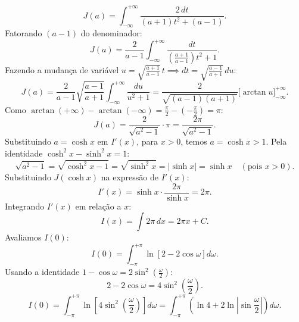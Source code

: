\documentclass[11pt,a4paper]{article}
\begin{document}
%
\begin{equation}
    J(a) = \int_{-\infty}^{+\infty} \frac{2\,dt}{(a+1)t^2 + (a-1)}.
\end{equation}
%
Fatorando $(a-1)$ do denominador:
\begin{equation}
    J(a) = \frac{2}{a-1} \int_{-\infty}^{+\infty} \frac{dt}{\left(\frac{a+1}{a-1}\right)t^2 + 1}.
\end{equation}
%
Fazendo a mudança de variável $u = \sqrt{\frac{a+1}{a-1}} \, t \implies dt = \sqrt{\frac{a-1}{a+1}} \, du$:
%
\begin{equation}
    J(a) = \frac{2}{a-1} \sqrt{\frac{a-1}{a+1}} \int_{-\infty}^{+\infty} \frac{du}{u^2 + 1} 
    = \frac{2}{\sqrt{(a-1)(a+1)}} \Big[ \arctan u \Big]_{-\infty}^{+\infty}.
\end{equation}
%
Como $\arctan(+\infty) - \arctan(-\infty) = \frac{\pi}{2} - \left(-\frac{\pi}{2}\right) = \pi$:
%
\begin{equation}
    J(a) = \frac{2}{\sqrt{a^2-1}} \cdot \pi = \frac{2\pi}{\sqrt{a^2-1}}.
\end{equation}
%
Substituindo $a = \cosh x$ em $I'(x)$, para $x > 0$, temos $a = \cosh x > 1$. Pela identidade $\cosh^2 x - \sinh^2 x = 1$:
%
\begin{equation}
    \sqrt{a^2-1} = \sqrt{\cosh^2 x - 1} = \sqrt{\sinh^2 x} = |\sinh x| = \sinh x \quad (\text{pois } x > 0).
\end{equation}
%
Substituindo $J(\cosh x)$ na expressão de $I'(x)$:
%
\begin{equation}
    I'(x) = \sinh x \cdot \frac{2\pi}{\sinh x} = 2\pi.
\end{equation}
%
Integrando $I'(x)$ em relação a $x$:
%
\begin{equation}
    I(x) = \int 2\pi \, dx = 2\pi x + C.
\end{equation}
%
Avaliamos $I(0)$:
%
\begin{equation}
    I(0) = \int_{-\pi}^{+\pi} \ln\left[2 - 2\cos\omega\right] d\omega.
\end{equation}
%
Usando a identidade $1 - \cos\omega = 2\sin^2\left(\frac{\omega}{2}\right)$:
%
\begin{equation}
    2 - 2\cos\omega = 4\sin^2\left(\frac{\omega}{2}\right).
\end{equation}
%
\begin{equation}
    I(0) = \int_{-\pi}^{+\pi} \ln\left[4\sin^2\left(\frac{\omega}{2}\right)\right] d\omega 
    = \int_{-\pi}^{+\pi} \left( \ln 4 + 2\ln\left|\sin\frac{\omega}{2}\right| \right) d\omega.
\end{equation}
\end{document}
